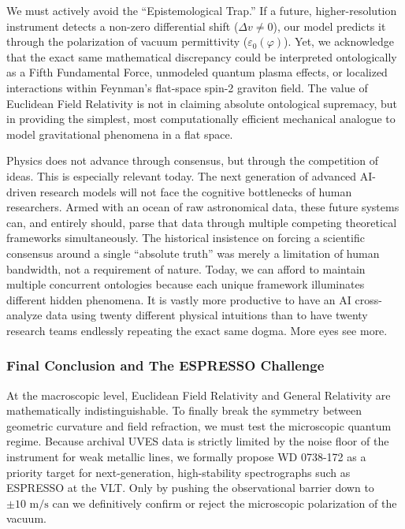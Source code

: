 \documentclass[twocolumn]{article}
\begin{document}
We must actively avoid the ``Epistemological Trap.'' If a future,
higher-resolution instrument detects a non-zero differential shift
(\(\Delta v \neq 0\)), our model predicts it through the polarization of
vacuum permittivity (\(\varepsilon_0(\varphi)\)). Yet, we acknowledge
that the exact same mathematical discrepancy could be interpreted
ontologically as a Fifth Fundamental Force, unmodeled quantum plasma
effects, or localized interactions within Feynman's flat-space spin-2
graviton field. The value of Euclidean Field Relativity is not in
claiming absolute ontological supremacy, but in providing the simplest,
most computationally efficient mechanical analogue to model
gravitational phenomena in a flat space.

Physics does not advance through consensus, but through the competition
of ideas. This is especially relevant today. The next generation of
advanced AI-driven research models will not face the cognitive
bottlenecks of human researchers. Armed with an ocean of raw
astronomical data, these future systems can, and entirely should, parse
that data through multiple competing theoretical frameworks
simultaneously. The historical insistence on forcing a scientific
consensus around a single ``absolute truth'' was merely a limitation of
human bandwidth, not a requirement of nature. Today, we can afford to
maintain multiple concurrent ontologies because each unique framework
illuminates different hidden phenomena. It is vastly more productive to
have an AI cross-analyze data using twenty different physical intuitions
than to have twenty research teams endlessly repeating the exact same
dogma. More eyes see more.

\subsubsection{Final Conclusion and The ESPRESSO
Challenge}\label{final-conclusion-and-the-espresso-challenge}

At the macroscopic level, Euclidean Field Relativity and General
Relativity are mathematically indistinguishable. To finally break the
symmetry between geometric curvature and field refraction, we must test
the microscopic quantum regime. Because archival UVES data is strictly
limited by the noise floor of the instrument for weak metallic lines, we
formally propose WD 0738-172 as a priority target for next-generation,
high-stability spectrographs such as ESPRESSO at the VLT. Only by
pushing the observational barrier down to \(\pm 10 \text{ m/s}\) can we
definitively confirm or reject the microscopic polarization of the
vacuum.
\end{document}
